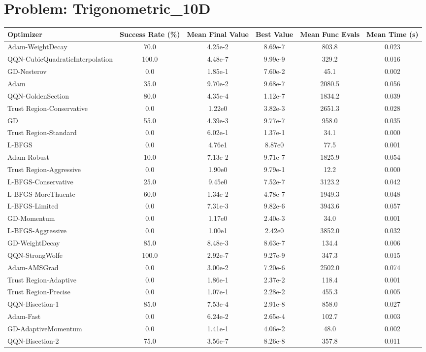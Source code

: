 \documentclass{article}
\begin{document}
\section{Problem: Trigonometric\_10D}
\begin{longtable}{p{3cm}*{5}{c}}
\toprule
\textbf{Optimizer} & \textbf{Success Rate (\%)} & \textbf{Mean Final Value} & \textbf{Best Value} & \textbf{Mean Func Evals} & \textbf{Mean Time (s)} \\
\midrule
Adam-WeightDecay & 70.0 & 4.25e-2 & 8.69e-7 & 803.8 & 0.023 \\
QQN-CubicQuadraticInterpolation & 100.0 & 4.48e-7 & 9.99e-9 & 329.2 & 0.016 \\
GD-Nesterov & 0.0 & 1.85e-1 & 7.60e-2 & 45.1 & 0.002 \\
Adam & 35.0 & 9.70e-2 & 9.68e-7 & 2080.5 & 0.056 \\
QQN-GoldenSection & 80.0 & 4.35e-4 & 1.12e-7 & 1834.2 & 0.039 \\
Trust Region-Conservative & 0.0 & 1.22e0 & 3.82e-3 & 2651.3 & 0.028 \\
GD & 55.0 & 4.39e-3 & 9.77e-7 & 958.0 & 0.035 \\
Trust Region-Standard & 0.0 & 6.02e-1 & 1.37e-1 & 34.1 & 0.000 \\
L-BFGS & 0.0 & 4.76e1 & 8.87e0 & 77.5 & 0.001 \\
Adam-Robust & 10.0 & 7.13e-2 & 9.71e-7 & 1825.9 & 0.054 \\
Trust Region-Aggressive & 0.0 & 1.90e0 & 9.79e-1 & 12.2 & 0.000 \\
L-BFGS-Conservative & 25.0 & 9.45e0 & 7.52e-7 & 3123.2 & 0.042 \\
L-BFGS-MoreThuente & 60.0 & 1.34e-2 & 4.78e-7 & 1949.3 & 0.048 \\
L-BFGS-Limited & 0.0 & 7.31e-3 & 9.82e-6 & 3943.6 & 0.057 \\
GD-Momentum & 0.0 & 1.17e0 & 2.40e-3 & 34.0 & 0.001 \\
L-BFGS-Aggressive & 0.0 & 1.00e1 & 2.42e0 & 3852.0 & 0.032 \\
GD-WeightDecay & 85.0 & 8.48e-3 & 8.63e-7 & 134.4 & 0.006 \\
QQN-StrongWolfe & 100.0 & 2.92e-7 & 9.27e-9 & 347.3 & 0.015 \\
Adam-AMSGrad & 0.0 & 3.00e-2 & 7.20e-6 & 2502.0 & 0.074 \\
Trust Region-Adaptive & 0.0 & 1.86e-1 & 2.37e-2 & 118.4 & 0.001 \\
Trust Region-Precise & 0.0 & 1.07e-1 & 2.28e-2 & 455.3 & 0.005 \\
QQN-Bisection-1 & 85.0 & 7.53e-4 & 2.91e-8 & 858.0 & 0.027 \\
Adam-Fast & 0.0 & 6.24e-2 & 2.65e-4 & 102.7 & 0.003 \\
GD-AdaptiveMomentum & 0.0 & 1.41e-1 & 4.06e-2 & 48.0 & 0.002 \\
QQN-Bisection-2 & 75.0 & 3.56e-7 & 8.26e-8 & 357.8 & 0.011 \\
\bottomrule
\end{longtable}
\end{document}
